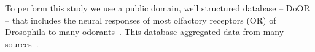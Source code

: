\documentclass[11pt]{article} %
\begin{document}
To perform this study we use a public domain, 
well structured database -- DoOR -- 
that includes the neural responses of most olfactory receptors (OR) of Drosophila to many odorants~\cite{Galizia2010}. 
This database aggregated data from many sources~\cite{Bruyne1999,Bruyne2001,Dobritsa2003,Goldman2005,Hallem2004,Hallem2006,
Kreher2005,Kreher2008,Kwon2007,Pelz2006,Pelz2006,Schmuker2007,Stensmyr2003,
Turner2009,VanderGoesvanNaters2007,Yao2005}.














 
\end{document}
